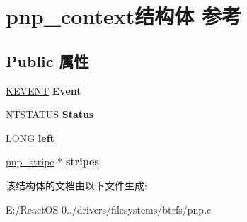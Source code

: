 \hypertarget{structpnp__context}{}\section{pnp\+\_\+context结构体 参考}
\label{structpnp__context}
\subsection*{Public 属性}
\begin{DoxyCompactItemize}
\item 
\mbox{\label{structpnp__context_a8ec0a4f27f5cbd041008a7dea2c459c0}} 
\hyperlink{struct___k_e_v_e_n_t}{K\+E\+V\+E\+NT} {\bfseries Event}
\item 
\mbox{\label{structpnp__context_a52bc81130fce6d3df83c451d0e5e612d}} 
N\+T\+S\+T\+A\+T\+US {\bfseries Status}
\item 
\mbox{\label{structpnp__context_a5122e761384be0487345ce3137dd85a4}} 
L\+O\+NG {\bfseries left}
\item 
\mbox{\label{structpnp__context_adda05e190720d7e14ed831f90b76bce8}} 
\hyperlink{structpnp__stripe}{pnp\+\_\+stripe} $\ast$ {\bfseries stripes}
\end{DoxyCompactItemize}


该结构体的文档由以下文件生成\+:\begin{DoxyCompactItemize}
\item 
E\+:/\+React\+O\+S-\/0../drivers/filesystems/btrfs/pnp.\+c\end{DoxyCompactItemize}
